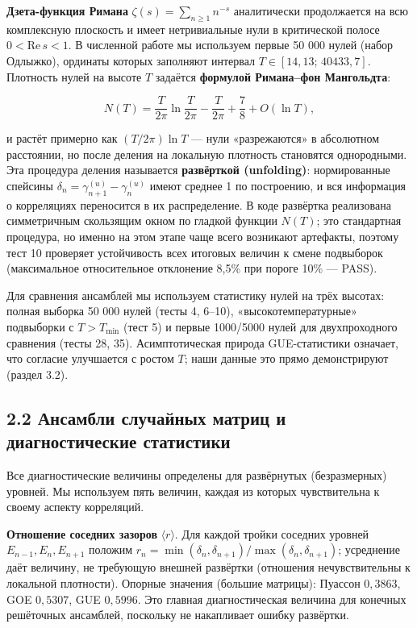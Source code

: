 \documentclass[
]{article}
\begin{document}
\textbf{Дзета-функция Римана} \(\zeta(s) = \sum_{n\ge1} n^{-s}\)
аналитически продолжается на всю комплексную плоскость и имеет
нетривиальные нули в критической полосе \(0<\mathrm{Re}\,s<1\). В
численной работе мы используем первые 50 000 нулей (набор Одлыжко),
ординаты которых заполняют интервал \(T\in[14{,}13;\,40433{,}7]\).
Плотность нулей на высоте \(T\) задаётся \textbf{формулой Римана--фон
Мангольдта}:

\[N(T) = \frac{T}{2\pi}\ln\frac{T}{2\pi} - \frac{T}{2\pi} + \frac{7}{8} + O(\ln T),\]

и растёт примерно как \((T/2\pi)\ln T\) --- нули «разрежаются» в
абсолютном расстоянии, но после деления на локальную плотность
становятся однородными. Эта процедура деления называется
\textbf{развёрткой (unfolding)}: нормированные спейсины
\(\delta_n = \gamma_{n+1}^{(u)} - \gamma_n^{(u)}\) имеют среднее 1 по
построению, и вся информация о корреляциях переносится в их
распределение. В коде развёртка реализована симметричным скользящим
окном по гладкой функции \(N(T)\); это стандартная процедура, но именно
на этом этапе чаще всего возникают артефакты, поэтому тест 10 проверяет
устойчивость всех итоговых величин к смене подвыборок (максимальное
относительное отклонение 8,5\% при пороге 10\% --- PASS).

Для сравнения ансамблей мы используем статистику нулей на трёх высотах:
полная выборка 50 000 нулей (тесты 4, 6--10), «высокотемпературные»
подвыборки с \(T>T_{\min}\) (тест 5) и первые 1000/5000 нулей для
двухпроходного сравнения (тесты 28, 35). Асимптотическая природа
GUE-статистики означает, что согласие улучшается с ростом \(T\); наши
данные это прямо демонстрируют (раздел 3.2).

\subsection{2.2 Ансамбли случайных матриц и диагностические
статистики}\label{ux430ux43dux441ux430ux43cux431ux43bux438-ux441ux43bux443ux447ux430ux439ux43dux44bux445-ux43cux430ux442ux440ux438ux446-ux438-ux434ux438ux430ux433ux43dux43eux441ux442ux438ux447ux435ux441ux43aux438ux435-ux441ux442ux430ux442ux438ux441ux442ux438ux43aux438}

Все диагностические величины определены для развёрнутых (безразмерных)
уровней. Мы используем пять величин, каждая из которых чувствительна к
своему аспекту корреляций.

\textbf{Отношение соседних зазоров} \(\langle r\rangle\). Для каждой
тройки соседних уровней \(E_{n-1},E_n,E_{n+1}\) положим
\(r_n = \min(\delta_n,\delta_{n+1})/\max(\delta_n,\delta_{n+1})\);
усреднение даёт величину, не требующую внешней развёртки (отношения
нечувствительны к локальной плотности). Опорные значения (большие
матрицы): Пуассон \(0{,}3863\), GOE \(0{,}5307\), GUE \(0{,}5996\). Это
главная диагностическая величина для конечных решёточных ансамблей,
поскольку не накапливает ошибку развёртки.
\end{document}
